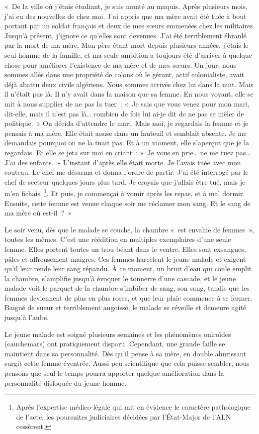 \documentclass[french,twoside]{book} %
\begin{document}
\bigbreak
\noindent « De la ville où j’étais étudiant, je suis monté au maquis. Après plusieurs mois, j’ai eu des nouvelles de chez moi. J’ai appris que ma mère avait été tuée à bout portant par un soldat   français et deux de mes sœurs emmenées chez les militaires. Jusqu’à présent, j’ignore ce qu’elles sont devenues. J’ai été terriblement ébranlé par la mort de ma mère. Mon père étant mort depuis plusieurs années, j’étais le seul homme de la famille, et ma seule ambition a toujours été d’arriver à quelque chose pour améliorer l’existence de ma mère et de mes sœurs. Un jour, nous sommes allés dans une propriété de colons où le gérant, actif colonialiste, avait déjà abattu deux civils algériens. Nous sommes arrivés chez lui dans la nuit. Mais il n’était pas là. Il n’y avait dans la maison que sa femme. En nous voyant, elle se mit à nous supplier de ne pas la tuer : « Je sais que vous venez pour mon mari, dit-elle, mais il n’est pas là… combien de fois lui ai-je dit de ne pas se mêler de politique. » On décida d’attendre le mari. Mais moi, je regardais la femme et je pensais à ma mère. Elle était assise dans un fauteuil et semblait absente. Je me demandais pourquoi on ne la tuait pas. Et à un moment, elle s’aperçut que je la regardais. Et elle se jeta sur moi en criant : « Je vous en prie… ne me tuez pas… J’ai des enfants. » L’instant d’après elle était morte. Je l’avais tuée avec mon couteau. Le chef me désarma et donna l’ordre de partir. J’ai été interrogé par le chef de secteur quelques jours plus tard. Je croyais que j’allais être tué, mais je m’en fichais \footnote{Après l’expertise médico-légale qui mit en évidence le caractère pathologique de l’acte, les poursuites judiciaires décidées par l’État-Major de l’ALN cessèrent.}. Et puis, je commençai à vomir après les repas, et à mal dormir. Ensuite, cette femme est venue chaque soir me réclamer mon sang. Et le sang de ma mère où est-il ? »\par
Le soir venu, dès que le malade se couche, la chambre « est envahie de femmes », toutes les mêmes. C’est une réédition en multiples exemplaires d’une seule femme. Elles portent toutes un trou béant dans le ventre. Elles sont exsangues, pâles et affreusement maigres. Ces femmes harcèlent le jeune malade et exigent qu’il leur rende leur sang répandu. À ce moment, un bruit d’eau qui coule emplit la chambre, s’amplifie jusqu’à   évoquer le tonnerre d’une cascade, et le jeune malade voit le parquet de la chambre s’imbiber de sang, son sang, tandis que les femmes deviennent de plus en plus roses, et que leur plaie commence à se fermer. Baigné de sueur et terriblement angoissé, le malade se réveille et demeure agité jusqu’à l’aube.\par
Le jeune malade est soigné plusieurs semaines et les phénomènes oniroïdes (cauchemars) ont pratiquement disparu. Cependant, une grande faille se maintient dans sa personnalité. Dès qu’il pense à sa mère, en double ahurissant surgit cette femme éventrée. Aussi peu scientifique que cela puisse sembler, nous pensons que seul le temps pourra apporter quelque amélioration dans la personnalité disloquée du jeune homme.
\end{document}
